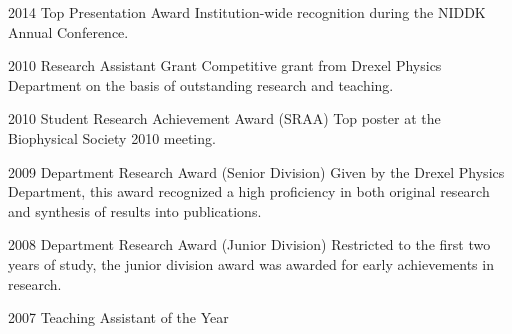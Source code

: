 \documentclass[]{scrartcl}
\begin{document}
\begin{cleanCV}



\WorkExperienceX
{2014}
{Top Presentation Award}
{Institution-wide recognition during the NIDDK Annual Conference.}

\WorkExperienceX
{2010}
{Research Assistant Grant}
{Competitive grant from Drexel Physics Department on the basis of outstanding research and teaching.}

\WorkExperienceX
{2010}
{Student Research Achievement Award (SRAA)}
{Top poster at the Biophysical Society 2010 meeting. }

\WorkExperienceX
{2009}
{Department Research Award (Senior Division)}
{Given by the Drexel Physics Department, this award recognized a high proficiency in both original research and synthesis of results into publications.}

\WorkExperienceX
{2008}
{Department Research Award (Junior Division)}
{Restricted to the first two years of study, the junior division award was awarded for early achievements in research.}

\WorkExperienceX
{2007}
{Teaching Assistant of the Year} {}


\end{cleanCV}
\end{document}
